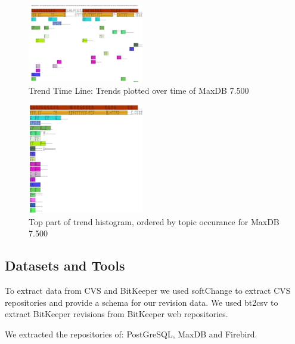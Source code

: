 \documentclass[times, 10pt,twocolumn]{article}
\begin{document}
\begin{figure}
  \centering
  \includegraphics[width=0.45\textwidth]{class-smear-plot-crop-scaled}
  \caption{Trend Time Line: Trends plotted over time of MaxDB 7.500}         
  \label{fig:trendtimeline}
\end{figure}


\begin{figure}
  \centering
  \includegraphics[width=0.45\textwidth]{histogram-cropped-scaled}
  \caption{Top part of trend histogram, ordered by topic occurance for MaxDB 7.500}       
  \label{fig:histogram}
\end{figure}


\subsection{Datasets and Tools}

To extract data from CVS and BitKeeper we used softChange to extract
CVS repositories and provide a schema for our revision data. We used
bt2csv to extract BitKeeper revisions from BitKeeper web repositories.

We extracted the repositories of: PostGreSQL, MaxDB and
Firebird.

\end{document}
